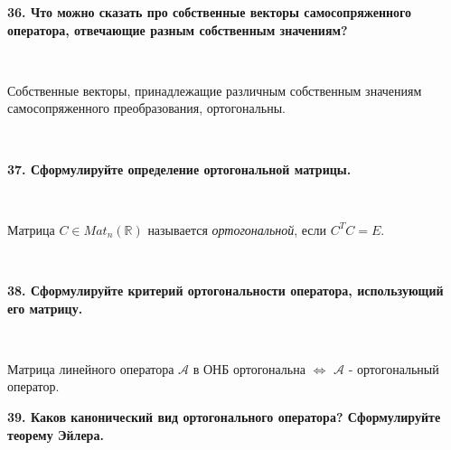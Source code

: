 \documentclass{article}
\begin{document}
	\textbf{36. Что можно сказать про собственные векторы самосопряженного оператора, отвечающие разным собственным значениям?}
	
	{
		$\;$
		
		\setlength{\parindent}{0.4cm}
		\hangindent=0.4cm
		
		Собственные векторы, принадлежащие различным собственным значениям самосопряженного преобразования, ортогональны.
		
		$\;$
		\setlength{\parindent}{0cm}
		\hangindent=0cm
	}

	\textbf{37. Сформулируйте определение ортогональной матрицы.}
	
	{
		$\;$
		\setlength{\parindent}{0.4cm}
		\hangindent=0.4cm
		
		Матрица $C \in Mat_n(\mathbb{R})$ называется \textit{ортогональной}, если $C^T C = E$.
		
		$\;$
		\setlength{\parindent}{0cm}
		\hangindent=0cm
	}

	\textbf{38. Сформулируйте критерий ортогональности оператора, использующий его матрицу.}
	
	{
		$\;$
		\setlength{\parindent}{0.4cm}
		\hangindent=0.4cm
		
		Матрица линейного оператора $\mathcal{A}$ в ОНБ ортогональна $\Leftrightarrow$ $\mathcal{A}$ - ортогональный оператор.
		$\;$
		\setlength{\parindent}{0cm}
		\hangindent=0cm
	}

	\newpage

	\textbf{39. Каков канонический вид ортогонального оператора? Сформулируйте теорему Эйлера.}
	
\end{document}
